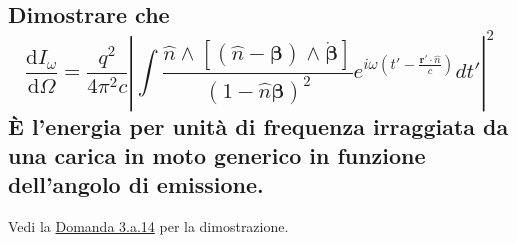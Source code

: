 \subsection[]{Dimostrare che 
\[
	\frac{\mbox{d} I_{\omega}}{\mbox{d} \Omega} = \frac{q^2}{4 \pi^2 c} \left| \int{ \frac{\hat{n} \wedge \left[ \left( \hat{n}-\boldsymbol{\beta}\right) \wedge \dot{\boldsymbol{\beta}} \right]}{\left( 1- \hat{n} \boldsymbol{\beta}\right)^2} e^{i\omega \left( t' - \frac{\boldsymbol{r'} \cdot \hat{n}}{c} \right) }  } dt' \right|^2\]
È l'energia per unità di frequenza irraggiata da una carica in moto generico in funzione dell'angolo di emissione.
}
\label{sec:5.c.2}
Vedi la \hyperref[sec:3.a.14]{Domanda 3.a.14} per la dimostrazione.


